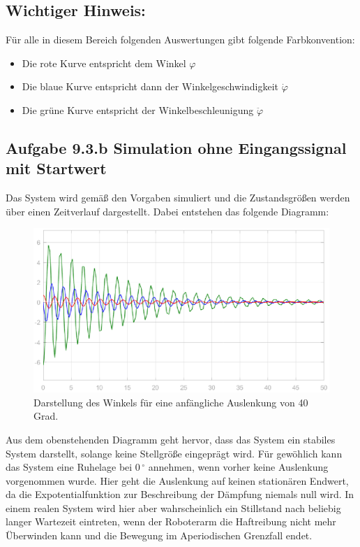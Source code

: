\documentclass[10pt]{scrartcl}
\begin{document}
\subsection{Wichtiger Hinweis:}
Für alle in diesem Bereich folgenden Auswertungen gibt folgende Farbkonvention:
\begin{itemize}
\item Die rote Kurve entspricht dem Winkel $\varphi$
\item Die blaue Kurve entspricht dann der Winkelgeschwindigkeit $\dot \varphi$
\item Die grüne Kurve entspricht der Winkelbeschleunigung  $ \ddot \varphi$
\end{itemize}



\subsection{Aufgabe 9.3.b Simulation ohne Eingangssignal mit Startwert}
Das System wird gemäß den Vorgaben simuliert und die Zustandsgrößen werden über einen Zeitverlauf dargestellt. Dabei entstehen das folgende Diagramm:

\begin{figure}[H]
	\centering
	\includegraphics[width=1\textwidth]{9b}
	\caption{Darstellung des Winkels für eine anfängliche Auslenkung von 40 Grad. }
	\label{img:grafik-dummy}
\end{figure}

Aus dem obenstehenden Diagramm geht hervor, dass das System ein stabiles System darstellt, solange keine Stellgröße eingeprägt wird. Für gewöhlich kann das System eine Ruhelage bei 0\,$^\circ$ annehmen, wenn vorher keine Auslenkung vorgenommen wurde. Hier geht die Auslenkung auf keinen stationären Endwert, da die Expotentialfunktion zur Beschreibung der Dämpfung niemals null wird. In einem realen System wird hier aber wahrscheinlich ein Stillstand nach beliebig langer Wartezeit eintreten, wenn der Roboterarm die Haftreibung nicht mehr Überwinden kann und die Bewegung im Aperiodischen Grenzfall endet.
\newpage
\end{document}
